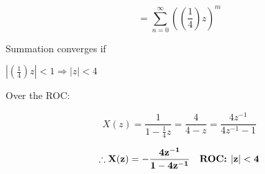 \documentclass[fleqn]{article}
\begin{document}
\begin{enumerate}[nolistsep]
\begin{enumerate}[nolistsep]
					\begin{equation*}
						= \sum_{n=0}^{\infty}\left(\left(\frac{1}{4}\right)z\right)^{m}
					\end{equation*}
					
					Summation converges if
					
					$\left|\left(\frac{1}{4}\right)z\right| < 1 \Rightarrow |z| < 4$
					
					Over the ROC:
					
					\begin{equation*}
						X(z) = \frac{1}{1 - \frac{1}{4}z} = \frac{4}{4 - z} = \frac{4z^{-1}}{4z^{-1} - 1}
					\end{equation*}
					
					\begin{equation*}
						\mathbf{\therefore X(z) = -\frac{4z^{-1}}{1 - 4z^{-1}} \quad \text{\textbf{ROC: }} |z| < 4}
					\end{equation*}
			\end{enumerate}
	\end{enumerate}
\end{document}
